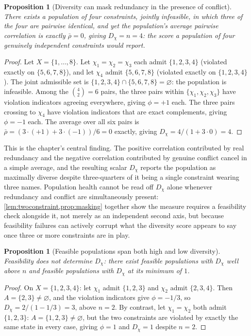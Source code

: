\documentclass[12pt]{report}
\newtheorem{proposition}[definition]{Proposition}
\begin{document}
\begin{proposition}[Diversity can mask redundancy in the presence of conflict]
\label{prop:masking}
There exists a population of four constraints, jointly infeasible, in
which three of the four are pairwise identical, and yet the population's
average pairwise correlation is exactly $\bar\rho = 0$, giving $D_\chi =
n = 4$: the score a population of four genuinely independent constraints
would report.
\end{proposition}

\begin{proof}
Let $X = \{1,\ldots,8\}$. Let $\chi_1 = \chi_2 = \chi_3$ each admit
$\{1,2,3,4\}$ (violated exactly on $\{5,6,7,8\}$), and let $\chi_4$
admit $\{5,6,7,8\}$ (violated exactly on $\{1,2,3,4\}$). The joint
admissible set is $\{1,2,3,4\} \cap \{5,6,7,8\} = \varnothing$: the
population is infeasible. Among the $\binom{4}{2} = 6$ pairs, the three
pairs within $\{\chi_1,\chi_2,\chi_3\}$ have violation indicators
agreeing everywhere, giving $\phi = +1$ each. The three pairs crossing
to $\chi_4$ have violation indicators that are exact complements,
giving $\phi = -1$ each. The average over all six pairs is $\bar\rho =
(3\cdot(+1) + 3\cdot(-1))/6 = 0$ exactly, giving $D_\chi = 4/(1 + 3
\cdot 0) = 4$.
\end{proof}

This is the chapter's central finding. The positive correlation
contributed by real redundancy and the negative correlation contributed
by genuine conflict cancel in a simple average, and the resulting scalar
$D_\chi$ reports the population as maximally diverse despite
three-quarters of it being a single constraint wearing three names.
Population health cannot be read off $D_\chi$ alone whenever redundancy
and conflict are simultaneously present: \cref{lem:twoconstraint,prop:masking}
together show the measure requires a feasibility check alongside it, not
merely as an independent second axis, but because feasibility failures
can actively corrupt what the diversity score appears to say once three
or more constraints are in play.

\begin{proposition}[Feasible populations span both high and low diversity]
\label{prop:feasiblespan}
Feasibility does not determine $D_\chi$: there exist feasible
populations with $D_\chi$ well above $n$ and feasible populations with
$D_\chi$ at its minimum of $1$.
\end{proposition}

\begin{proof}
On $X = \{1,2,3,4\}$: let $\chi_1$ admit $\{1,2,3\}$ and $\chi_2$ admit
$\{2,3,4\}$. Then $A = \{2,3\} \neq \varnothing$, and the violation
indicators give $\phi = -1/3$, so $D_\chi = 2/(1 - 1/3) = 3$, above $n =
2$. By contrast, let $\chi_1 = \chi_2$ both admit $\{1,2,3\}$: $A =
\{1,2,3\} \neq \varnothing$, but the two constraints are violated by
exactly the same state in every case, giving $\phi = 1$ and $D_\chi = 1$
despite $n = 2$.
\end{proof}
\end{document}
